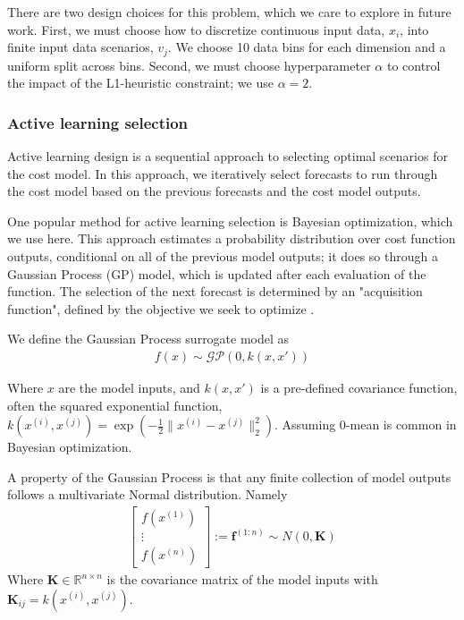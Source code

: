 \documentclass[10pt,twocolumn,letterpaper]{article}
\begin{document}
There are two design choices for this problem, which we care to explore in future work. First, we must choose how to discretize continuous input data, $x_i$, into finite input data scenarios, $v_j$. We choose 10 data bins for each dimension and a uniform split across bins. Second, we must choose hyperparameter $\alpha$ to control the impact of the L1-heuristic constraint; we use $\alpha=2$. 

\subsubsection{Active learning selection}
Active learning design is a sequential approach to selecting optimal scenarios for the cost model. In this approach, we iteratively select forecasts to run through the cost model based on the previous forecasts and the cost model outputs.

One popular method for active learning selection is Bayesian optimization, which we use here. This approach estimates a probability distribution over cost function outputs, conditional on all of the previous model outputs; it does so through a Gaussian Process (GP) model, which is updated after each evaluation of the function. The selection of the next forecast is determined by an "acquisition function", defined by the objective we seek to optimize \cite{brochu2010tutorial} \cite{wang2022intuitive}. 

We define the Gaussian Process surrogate model as
\begin{align*}
    f(x) \sim \mathcal{GP}(0, k(x, x'))
\end{align*}

Where $x$ are the model inputs, and $k(x, x')$ is a pre-defined covariance function, often the squared exponential function, $k(x^{(i)}, x^{(j)}) = \exp\left(-\frac{1}{2}\lVert x^{(i)} - x^{(j)}\rVert^2_2\right)$. Assuming 0-mean is common in Bayesian optimization.

A property of the Gaussian Process is that any finite collection of model outputs follows a multivariate Normal distribution. Namely
\begin{align*}
    \begin{bmatrix}
        f(x^{(1)})\\\vdots\\f(x^{(n)})
    \end{bmatrix} := \textbf{f}^{(1:n)} \sim N(0, \textbf{K})
\end{align*}
Where $\textbf{K}\in \mathbb{R}^{n\times n}$ is the covariance matrix of the model inputs with $\textbf{K}_{ij} = k(x^{(i)}, x^{(j)})$.
\end{document}
